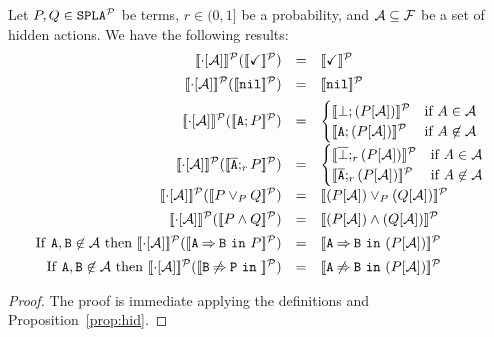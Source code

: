 \bprop
  Let $P,Q\in\mathtt{SPLA{^{\cal P}}}$ be terms, $r\in (0,1]$ be a probability, and
  ${\cal A}\subseteq{\cal F}$ be a set of hidden actions. We have the following results:
  $$\begin{array}{rll}
  \semdenp{\cdot\hide\calA}(\semdenp{\checkmark})&=&\semdenp{\checkmark}\\[0.5em]
  \semdenp{\cdot\hide\calA}(\semdenp{\nil})&=&\semdenp{\nil}\\[0.5em]
  \semdenp{\cdot\hide\calA}(\semdenp{\fA;P})&=&
      \begin{cases}
        \semdenp{\bot;(P\hide\calA)} & \mbox{if } A\in\calA\\
        \semdenp{\fA;(P\hide\calA)} & \mbox{if } A\not\in\calA\\
      \end{cases}\\[1em]
  \semdenp{\cdot\hide\calA}(\semdenp{\ofA;_rP})&=&
      \begin{cases}
        \semdenp{\overline{\bot};_r(P\hide\calA)} & \mbox{if } A\in\calA\\
        \semdenp{\ofA;_r(P\hide\calA)} & \mbox{if } A\not\in\calA\\
      \end{cases}\\[1em]
  \semdenp{\cdot\hide\calA}(\semdenp{P\choice_P Q})&=&\semdenp{(P\hide\calA)\choice_P (Q\hide\calA)}\\[0.5em]
  \semdenp{\cdot\hide\calA}(\semdenp{P\paral Q})&=&\semdenp{(P\hide\calA)\paral (Q\hide\calA)}\\[0.5em]
  \mathrm{If\ } \fA,\fB\not\in\calA \mathrm{\ then\ }
    \semdenp{\cdot\hide\calA}(\semdenp{\require{A}{B}{P}})&=&\semdenp{\require{A}{B}{(P\hide\calA)}}\\[0.5em]
  \mathrm{If\ } \fA,\fB\not\in\calA \mathrm{\ then\ }
    \semdenp{\cdot\hide\calA}(\semdenp{\exclude{B}{P}})&=&\semdenp{\exclude{A}{B}{(P\hide\calA)}}
  \end{array}$$
  \begin{proof}
    The proof is immediate applying the definitions and
   Proposition~\ref{prop:hid}.
 \end{proof}
\eprop


